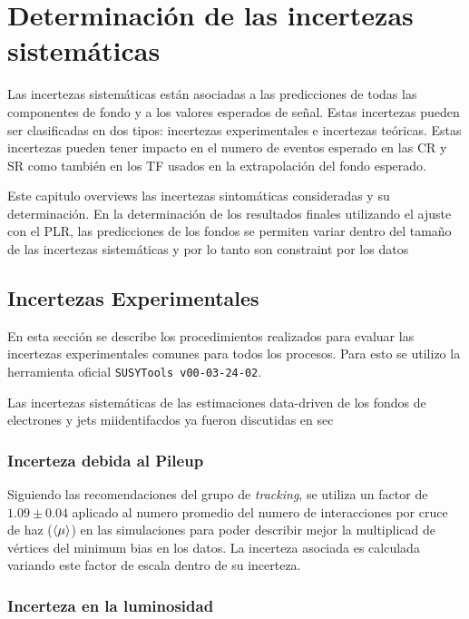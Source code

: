 \chapter{Determinación de las incertezas sistemáticas}

Las incertezas sistemáticas están asociadas a las predicciones de todas
las componentes de fondo y a los valores esperados de señal. Estas
incertezas pueden ser clasificadas en dos tipos: incertezas experimentales
e incertezas teóricas. Estas incertezas pueden tener impacto en el numero
de eventos esperado en las CR y SR como también en los TF usados
en la extrapolación del fondo esperado.

Este capitulo overviews las incertezas sintomáticas consideradas y su determinación.
En la determinación de los resultados finales utilizando el ajuste con el PLR,
las predicciones de los fondos se permiten variar dentro del tamaño de las
incertezas sistemáticas y por lo tanto son constraint por los datos


\section{Incertezas Experimentales}\label{sec:expsyst}

En esta sección se describe los procedimientos realizados para evaluar
las incertezas experimentales comunes para todos los procesos. Para esto
se utilizo la herramienta oficial \texttt{SUSYTools v00-03-24-02}.

Las incertezas sistemáticas de las estimaciones data-driven
de los fondos de electrones y jets miidentifacdos ya fueron discutidas
en sec \XXX


\subsection{Incerteza debida al Pileup}

Siguiendo las recomendaciones del grupo de \emph{tracking}, se utiliza
un factor de $1.09 \pm 0.04$ aplicado al numero promedio del numero de
interacciones por cruce de haz ($\langle \mu \rangle$) en las simulaciones para poder
describir mejor la multiplicad de vértices del minimum bias en los datos.
La incerteza asociada es calculada variando este factor de escala dentro
de su incerteza.

\subsection{Incerteza en la luminosidad}

